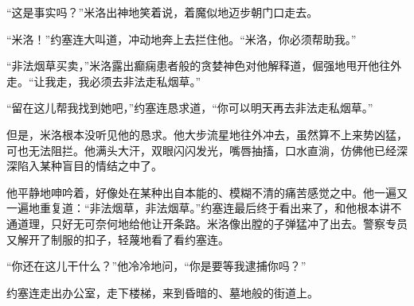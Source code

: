     “这是事实吗？”米洛出神地笑着说，着魔似地迈步朝门口走去。

    “米洛！”约塞连大叫道，冲动地奔上去拦住他。“米洛，你必须帮助我。”

    “非法烟草买卖，”米洛露出癫痫患者般的贪婪神色对他解释道，倔强地甩开他往外走。“让我走，我必须去非法走私烟草。”

    “留在这儿帮我找到她吧，”约塞连恳求道，“你可以明天再去非法走私烟草。”

    但是，米洛根本没听见他的恳求。他大步流星地往外冲去，虽然算不上来势凶猛，可也无法阻拦。他满头大汗，双眼闪闪发光，嘴唇抽搐，口水直淌，仿佛他已经深深陷入某种盲目的情结之中了。

    他平静地呻吟着，好像处在某种出自本能的、模糊不清的痛苦感觉之中。他一遍又一遍地重复道：“非法烟草，非法烟草。”约塞连最后终于看出来了，和他根本讲不通道理，只好无可奈何地给他让开条路。米洛像出膛的子弹猛冲了出去。警察专员又解开了制服的扣子，轻蔑地看了看约塞连。

    “你还在这儿干什么？”他冷冷地问，“你是要等我逮捕你吗？”

    约塞连走出办公室，走下楼梯，来到昏暗的、墓地般的街道上。

